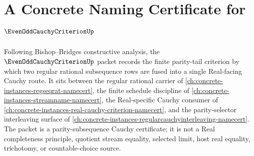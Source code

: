 \chapter{A Concrete Naming Certificate for $\EvenOddCauchyCriterionUp$}
\label{ch:concrete-instances-even-odd-cauchy-criterion-namecert}

Following Bishop--Bridges constructive analysis, the $\EvenOddCauchyCriterionUp$ packet records the finite parity-tail criterion by which two regular rational subsequence rows are fused into a single Real-facing Cauchy route. It sits between the regular rational carrier of \autoref{ch:concrete-instances-regseqrat-namecert}, the finite schedule discipline of \autoref{ch:concrete-instances-streamname-namecert}, the Real-specific Cauchy consumer of \autoref{ch:concrete-instances-real-cauchy-criterion-namecert}, and the parity-selector interleaving surface of \autoref{ch:concrete-instances-regularcauchyinterleaving-namecert}. The packet is a parity-subsequence Cauchy certificate; it is not a Real completeness principle, quotient stream equality, selected limit, host real equality, trichotomy, or countable-choice source.


